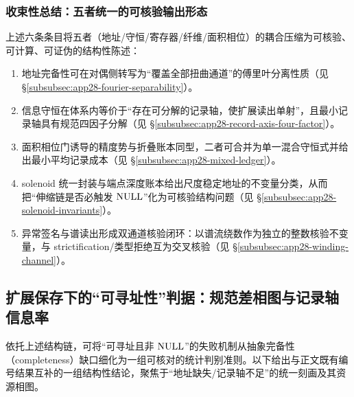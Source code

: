 \subsubsection{收束性总结：五者统一的可核验输出形态}
上述六条条目将五者（地址/守恒/寄存器/纤维/面积相位）的耦合压缩为可核验、可计算、可证伪的结构性陈述：
\begin{enumerate}
  \item 地址完备性可在对偶侧转写为“覆盖全部扭曲通道”的傅里叶分离性质（见 \S\ref{subsubsec:app28-fourier-separability}）。
  \item 信息守恒在体系内等价于“存在可分解的记录轴，使扩展读出单射”，且最小记录轴具有规范四因子分解（见 \S\ref{subsubsec:app28-record-axis-four-factor}）。
  \item 面积相位门诱导的精度势与折叠账本同型，二者可合并为单一混合守恒式并给出最小平均记录成本（见 \S\ref{subsubsec:app28-mixed-ledger}）。
  \item solenoid 统一封装与端点深度账本给出尺度稳定地址的不变量分类，从而把“伸缩链是否必触发 $\mathrm{NULL}$”化为可核验结构问题（见 \S\ref{subsubsec:app28-solenoid-invariants}）。
  \item 异常签名与谱读出形成双通道核验闭环：以谱流绕数作为独立的整数核验不变量，与 strictification/类型拒绝互为交叉核验（见 \S\ref{subsubsec:app28-winding-channel}）。
\end{enumerate}

\subsection{扩展保存下的“可寻址性”判据：规范差相图与记录轴信息率}
依托上述结构链，可将“可寻址且非 $\mathrm{NULL}$”的失败机制从抽象完备性（completeness）缺口细化为一组可核对的统计判别准则。以下给出与正文既有编号结果互补的一组结构性结论，聚焦于“地址缺失/记录轴不足”的统一刻画及其资源相图。

